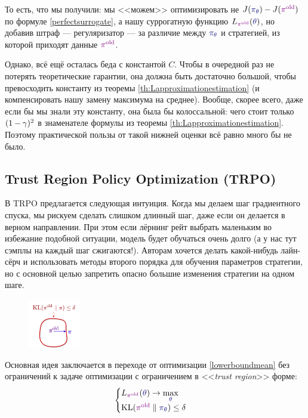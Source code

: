 То есть, что мы получили: мы <<можем>> оптимизировать не $J(\textcolor{ChadBlue}{\pi_\theta}) - J(\textcolor{ChadPurple}{\pi^{\old}})$ по формуле \eqref{perfectsurrogate}, а нашу суррогатную функцию $L_{\textcolor{ChadPurple}{\pi^{\old}}}(\textcolor{ChadBlue}{\theta})$, но добавив штраф --- регуляризатор --- за различие между $\textcolor{ChadBlue}{\pi_\theta}$ и стратегией, из которой приходят данные $\textcolor{ChadPurple}{\pi^{\old}}$.

Однако, всё ещё осталась беда с константой $C$. Чтобы в очередной раз не потерять теоретические гарантии, она должна быть достаточно большой, чтобы превосходить константу из теоремы \ref{th:Lapproximationestimation} (и компенсировать нашу замену максимума на среднее). Вообще, скорее всего, даже если бы мы знали эту константу, она была бы колоссальной: чего стоит только $(1 \HM- \gamma)^2$ в знаменателе формулы из теоремы \ref{th:Lapproximationestimation}. Поэтому практической пользы от такой нижней оценки всё равно много бы не было.

\subsection{Trust Region Policy Optimization (TRPO)}

В TRPO предлагается следующая интуиция. Когда мы делаем шаг градиентного спуска, мы рискуем сделать слишком длинный шаг, даже если он делается в верном направлении. При этом если лёрнинг рейт выбрать маленьким во избежание подобной ситуации, модель будет обучаться очень долго (а у нас тут сэмплы на каждый шаг сжигаются!). Авторам хочется делать какой-нибудь лайн-сёрч и использовать методы второго порядка для обучения параметров стратегии, но с основной целью запретить опасно большие изменения стратегии на одном шаге.

\begin{figure}
\vspace{-0.5cm}
\centering
\includegraphics[width=0.2\textwidth]{Images/HardTrustRegion.png}
\vspace{-0.9cm}
\end{figure}

Основная идея заключается в переходе от оптимизации \eqref{lowerboundmean} без ограничений к задаче оптимизации с ограничением в <<\emph{trust region}>> форме:
\begin{equation}\label{trustregion}
\begin{cases}
L_{\textcolor{ChadPurple}{\pi^{\old}}}(\textcolor{ChadBlue}{\theta}) \to \max\limits_{\textcolor{ChadBlue}{\theta}} \\
\KL(\textcolor{ChadPurple}{\pi^{\old}} \parallel \textcolor{ChadBlue}{\pi_\theta}) \le \delta
\end{cases}
\end{equation}

